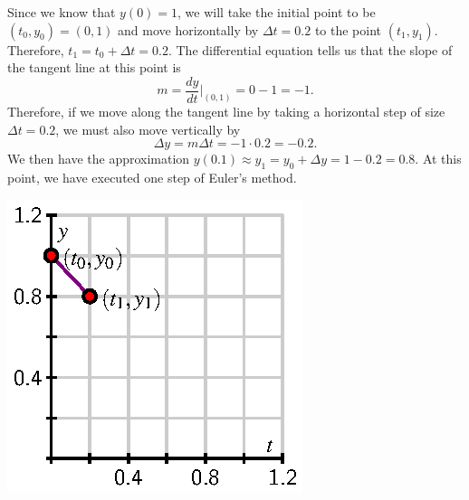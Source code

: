 \noindent \begin{minipage}[l]{3.6in}
Since we know that $y(0) = 1$, we will take the initial point to be
$(t_0,y_0) = (0,1)$ and move horizontally by $\Delta t = 0.2$ to the
point $(t_1,y_1)$.  Therefore, $t_1=t_0+\Delta t = 0.2$. 
The differential equation tells us that the slope of the 
tangent line at this point is
$$
m=\frac{dy}{dt}\bigg\vert_{(0,1)} = 0-1 = -1.
$$
Therefore, if we move along the tangent line by taking a horizontal
step of size $\Delta t=0.2$, we must also move vertically by
$$\Delta y = m\Delta t = -1\cdot 0.2 = -0.2.$$  We then have the
approximation $y(0.1) \approx y_1= y_0 + \Delta y = 1 - 0.2 = 0.8.$  At this point, we have executed one step of Euler's method.
\end{minipage}
\hspace*{.25in}
\begin{minipage}[l]{2in}
\includegraphics{figures/7_3_euler_points_1.eps}
\end{minipage}

